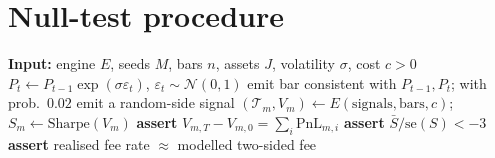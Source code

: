 \documentclass[preprint,12pt,authoryear]{elsarticle}
\begin{document}
\section{Null-test procedure}
\label{app:null}

\begin{algorithm}[H]
\caption{Randomised null test for a backtest engine}
\label{alg:null}
\begin{algorithmic}[1]
\State \textbf{Input:} engine $E$, seeds $M$, bars $n$, assets $J$, volatility $\sigma$, cost $c > 0$
      \State $P_t \gets P_{t-1}\exp(\sigma\varepsilon_t)$, \quad $\varepsilon_t \sim \mathcal{N}(0,1)$
      \State emit bar consistent with $P_{t-1}, P_t$; with prob.\ $0.02$ emit a random-side signal
    \EndFor
  \EndFor
  \State $(\mathcal{T}_m, V_m) \gets E(\text{signals}, \text{bars}, c)$; \quad $S_m \gets \mathrm{Sharpe}(V_m)$
  \State \textbf{assert} $V_{m,T} - V_{m,0} = \sum_i \mathrm{PnL}_{m,i}$ 
\EndFor
\State \textbf{assert} $\bar{S} / \mathrm{se}(S) < -3$ 
\State \textbf{assert} realised fee rate $\approx$ modelled two-sided fee
\end{algorithmic}
\end{algorithm}
\end{document}
